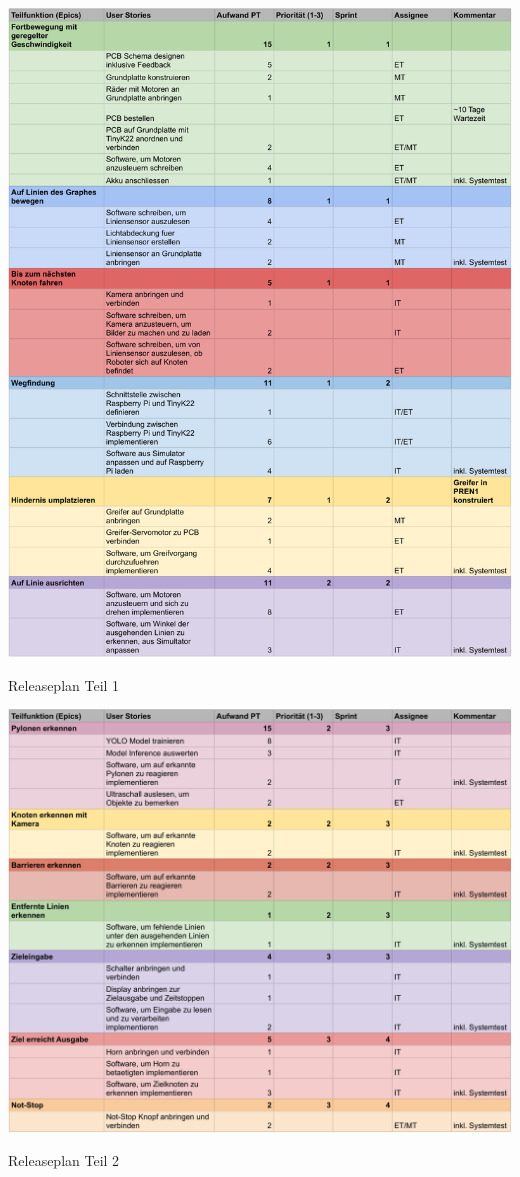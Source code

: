 \begin{table}[H]
\centering
\includegraphics[width=\textwidth]{assets/projektmanagement/releaseplan - plan-page1-crop.pdf}
\caption{Releaseplan Teil 1}
\label{table:release-plan-1}
\end{table}
\newpage

\begin{table}[H]
\centering
\includegraphics[width=\textwidth]{assets/projektmanagement/releaseplan - plan-page2-crop.pdf}
\caption{Releaseplan Teil 2}
\label{table:release-plan-2}
\end{table}
\newpage


